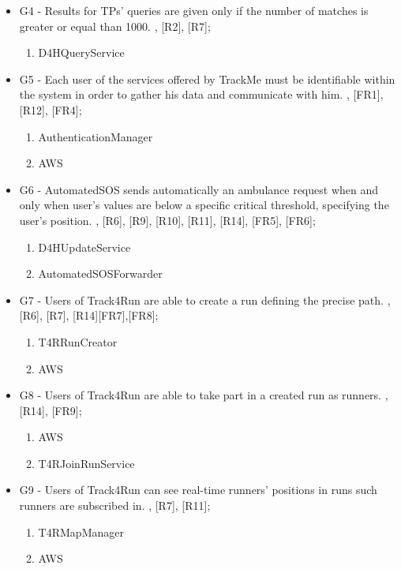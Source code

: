 \begin{itemize}
\item G4 - Results for TPs’ queries are given only if the number of matches is greater or equal than 1000. 
\newline [R1], [R2], [R7];
\begin{enumerate}
	\item D4HQueryService
\end{enumerate}


\item G5 - Each user of the services offered by TrackMe must be identifiable within the system in order to gather his data and communicate with him.
\newline [R6], [FR1], [R12], [FR4];
\begin{enumerate}
	\item AuthenticationManager
	\item AWS
\end{enumerate}



\item G6 - AutomatedSOS sends automatically an ambulance request when and only when user's values are below a specific critical threshold, specifying the user's position.
\newline [R5], [R6], [R9], [R10], [R11], [R14], [FR5], [FR6];
\begin{enumerate}
	\item D4HUpdateService
	\item AutomatedSOSForwarder
\end{enumerate}

\item G7 - Users of Track4Run are able to create a run defining the precise path.
\newline [R1], [R6], [R7], [R14][FR7],[FR8];
\begin{enumerate}
	\item T4RRunCreator
	\item AWS
\end{enumerate}



\item G8 - Users of Track4Run are able to take part in a created run as runners.
\newline [R7], [R14], [FR9];
\begin{enumerate}
	\item AWS
	\item T4RJoinRunService
\end{enumerate}



\item G9 - Users of Track4Run can see real-time runners' positions in runs such runners are subscribed in.
\newline [R4], [R7], [R11];
\begin{enumerate}
	\item T4RMapManager
	\item AWS
\end{enumerate}

\end{itemize}


